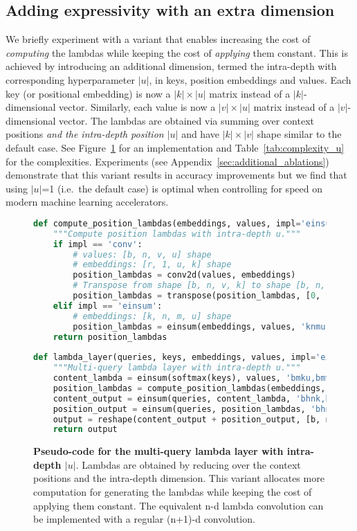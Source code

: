 \documentclass{article} \usepackage{iclr2021_conference,times}
\begin{document}
\subsection{Adding expressivity with an extra dimension\label{sec:lambda_layer_u}}
We briefly experiment with a variant that enables increasing the cost of \emph{computing} the lambdas while keeping the cost of \emph{applying} them constant.
This is achieved by introducing an additional dimension, termed the intra-depth with corresponding hyperparameter $|u|$, in keys, position embeddings and values.
Each key (or positional embedding) is now a $|k|\times|u|$ matrix instead of a $|k|$-dimensional vector.
Similarly, each value is now a $|v|\times|u|$ matrix instead of a $|v|$-dimensional vector.
The lambdas are obtained via summing over context positions \emph{and the intra-depth position $|u|$} and have  $|k|\times|v|$ shape similar to the default case.
See Figure~\ref{fig:lambda_layer_code_u} for an implementation and Table~\ref{tab:complexity_u} for the complexities.
Experiments (see Appendix~\ref{sec:additional_ablations}) demonstrate that this variant results in accuracy
improvements but we find that using $|u|$=1 (i.e.\ the default case) is optimal when controlling for speed on modern machine learning accelerators.

\begin{figure}[h]
\small
\begin{lstlisting}[language=python]
def compute_position_lambdas(embeddings, values, impl='einsum'):
    """Compute position lambdas with intra-depth u."""
    if impl == 'conv':
        # values: [b, n, v, u] shape
        # embeddings: [r, 1, u, k] shape
        position_lambdas = conv2d(values, embeddings) 
        # Transpose from shape [b, n, v, k] to shape [b, n, k, v]
        position_lambdas = transpose(position_lambdas, [0, 1, 3, 2])
    elif impl == 'einsum':
        # embeddings: [k, n, m, u] shape
        position_lambdas = einsum(embeddings, values, 'knmu,bmvu->bnkv')
    return position_lambdas
    
def lambda_layer(queries, keys, embeddings, values, impl='einsum'):
    """Multi-query lambda layer with intra-depth u."""
    content_lambda = einsum(softmax(keys), values, 'bmku,bmvu->bkv')
    position_lambdas = compute_position_lambdas(embeddings, values, lambda_conv)
    content_output = einsum(queries, content_lambda, 'bhnk,bkv->bnhv')
    position_output = einsum(queries, position_lambdas, 'bhnk,bnkv->bnhv')
    output = reshape(content_output + position_output, [b, n, d])
    return output
\end{lstlisting}
    \caption{
    \textbf{Pseudo-code for the multi-query lambda layer with intra-depth $|u|$}.
    Lambdas are obtained by reducing over the context positions and the intra-depth dimension.
    This variant allocates more computation for generating the lambdas while keeping the cost of applying them constant.
    The equivalent n-d lambda convolution can be implemented with a regular (n+1)-d convolution.
    }
    \label{fig:lambda_layer_code_u}
\end{figure}
\end{document}
